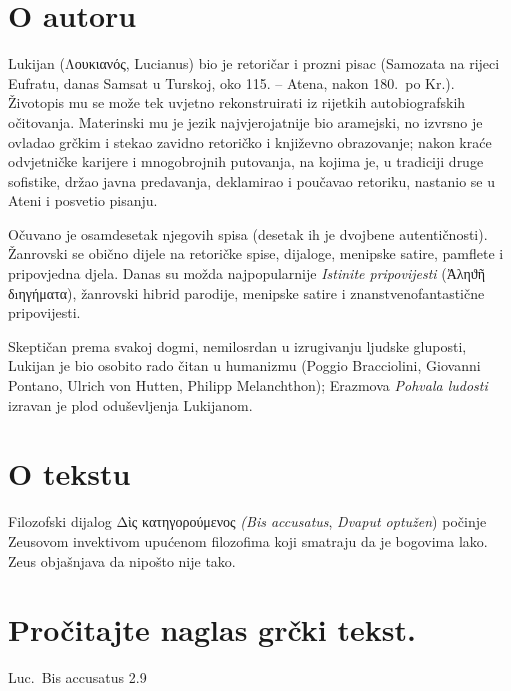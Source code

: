 \section*{O autoru}

Lukijan \textgreek[variant=ancient]{(Λουκιανός,} Lucianus) bio je retoričar i prozni pisac (Samozata na rijeci Eufratu, danas Samsat u Turskoj, oko 115. – Atena, nakon 180.\ po Kr.). Životopis mu se može tek uvjetno rekonstruirati iz rijetkih autobiografskih očitovanja. Materinski mu je jezik najvjerojatnije bio aramejski, no izvrsno je ovladao grčkim i stekao zavidno retoričko i književno obrazovanje; nakon kraće odvjetničke karijere i mnogobrojnih putovanja, na kojima je, u tradiciji druge sofistike, držao javna predavanja, deklamirao i poučavao retoriku, nastanio se u Ateni i posvetio pisanju.

Očuvano je osamdesetak njegovih spisa (desetak ih je dvojbene autentičnosti). Žanrovski se obično dijele na retoričke spise, dijaloge, menipske satire, pamflete i pripovjedna djela. Danas su možda najpopularnije \textit{Istinite pripovijesti} \textgreek[variant=ancient]{(Ἀληϑῆ δıηγήματα),} žanrovski hibrid parodije, menipske satire i znanstvenofantastične pripovijesti.

Skeptičan prema svakoj dogmi, nemilosrdan u izrugivanju ljudske gluposti, Lukijan je bio osobito rado čitan u humanizmu (Poggio Bracciolini, Giovanni Pontano, Ulrich von Hutten, Philipp Melanchthon); Erazmova \textit{Pohvala ludosti} izravan je plod oduševljenja Lukijanom.

\section*{O tekstu}

Filozofski dijalog \textgreek[variant=ancient]{Δὶς κατηγορούμενος} \textit{(Bis accusatus}, \textit{Dvaput optužen}) počinje Zeusovom invektivom upućenom filozofima koji smatraju da je bogovima lako. Zeus objašnjava da nipošto nije tako.

\newpage

\section*{Pročitajte naglas grčki tekst.}

Luc.\ Bis accusatus 2.9

\medskip

